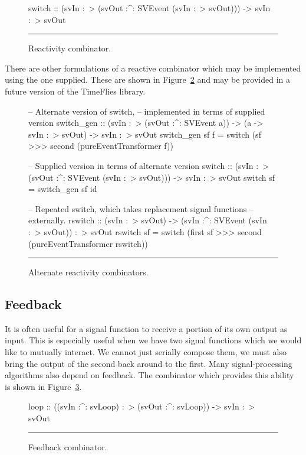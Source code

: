 \begin{figure}
\begin{code}
switch ::    (svIn :~> (svOut :^: SVEvent (svIn :~> svOut)))
          -> svIn :~> svOut
\end{code}
\hrule
\caption{Reactivity combinator.}
\label{figure:switch_combinator}
\end{figure}

There are other formulations of a reactive combinator which may be implemented
using the one supplied. These are shown in Figure~\ref{figure:alternate_switching_combinators}
and may be provided in a future version of the TimeFlies library.

\begin{figure}
\begin{code}
-- Alternate version of switch,
-- implemented in terms of supplied version
switch_gen ::    (svIn :~> (svOut :^: SVEvent a))
              -> (a -> svIn :~> svOut)
              -> svIn :~> svOut
switch_gen sf f =
  switch (sf >>> second (pureEventTransformer f))

-- Supplied version in terms of alternate version
switch ::    (svIn :~> (svOut :^: SVEvent (svIn :~> svOut)))
          -> svIn :~> svOut
switch sf = switch_gen sf id

-- Repeated switch, which takes replacement signal functions
-- externally.
rswitch ::    (svIn :~> svOut)
           -> (svIn :^: SVEvent (svIn :~> svOut)) :~> svOut
rswitch sf =
  switch (first sf >>> second (pureEventTransformer rswitch))
\end{code}
\hrule
\caption{Alternate reactivity combinators.}
\label{figure:alternate_switching_combinators}
\end{figure}

\subsection{Feedback}
\label{subsection:System_Design_and_Interface-Combinators-Feedback}

It is often useful for a signal function to receive a portion of its
own output as input. This is especially useful when we have two
signal functions which we would like to mutually interact. We cannot
just serially compose them, we must also bring the output of the second
back around to the first. Many signal-processing algorithms also depend
on feedback. The combinator which provides this ability is shown
in Figure~\ref{figure:feedback_combinator}. 

\begin{figure}
\begin{code}
loop ::    ((svIn :^: svLoop) :~> (svOut :^: svLoop))
        -> svIn :~> svOut
\end{code}
\hrule
\caption{Feedback combinator.}
\label{figure:feedback_combinator}
\end{figure}

